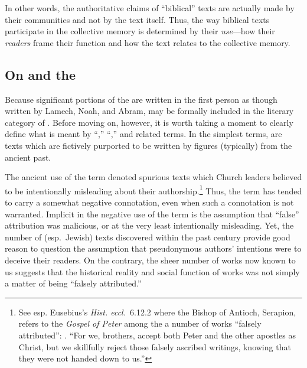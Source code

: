 In other words, the authoritative claims of ``biblical'' texts are actually made by their communities and not by the text itself. Thus, the way biblical texts participate in the collective memory is determined by their \emph{use}---how their \emph{readers} frame their function and how the text relates to the collective memory. 

\subsection{On \Psy and the \Psa}

Because significant portions of the \ga are written in the first person as though written by Lamech, Noah, and Abram, \ga may be formally included in the literary category of \psy. Before moving on, however, it is worth taking a moment to clearly define what is meant by ``\psy,'' ``\psa,'' and related terms.\autocites[The topic of \psy has received a large amount of very sophisticated attention in recent years. See especially][]{mroczek2016}{tigchelaar_tigchelaar2014}{reed_towsend-moulie2011}{reed_jts2009}{reed_ditomasso-turcescu2008}{najman_hilhorst-puech2007}{najman2003} In the simplest terms, \psa are texts which are fictively purported to be written by figures (typically) from the ancient past. 

The ancient use of the term \psa denoted spurious texts which Church leaders believed to be intentionally misleading about their authorship.\footnote{See esp. Eusebius's \emph{Hist. eccl.}~6.12.2 where the Bishop of Antioch, Serapion, refers to the \emph{Gospel of Peter} among the a number of works ``falsely attributed'': . ``For we, brothers, accept both Peter and the other apostles as Christ, but we skillfully reject those falsely ascribed writings, knowing that they were not handed down to us.''} Thus, the term has tended to carry a somewhat negative connotation, even when such a connotation is not warranted. Implicit in the negative use of the term is the assumption that ``false'' attribution was malicious, or at the very least intentionally misleading. Yet, the number of (esp.~Jewish) \psgraphical texts discovered within the past century provide good reason to question the assumption that pseudonymous authors' intentions were to deceive their readers.\autocites[53--58]{mroczek2016}[See also][]{reed_jts2009} On the contrary, the sheer number of \psgraphical works now known to us suggests that the historical reality and social function of \psgraphical works was not simply a matter of being ``falsely attributed.''

